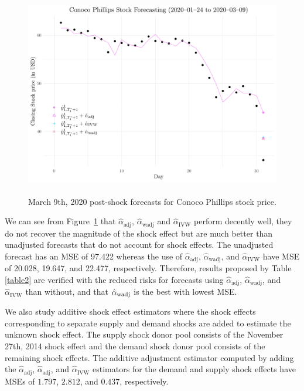 \documentclass[11pt]{article}
\theoremstyle{definition}
\begin{document}
\begin{figure}
  \begin{center}
    \includegraphics[height = 9cm]{fig2.pdf}
    \caption{March 9th, 2020 post-shock forecasts for Conoco Phillips stock price.}
    \label{Fig:CP}
  \end{center}  
  \vspace{-.6cm}
\end{figure}


We can see from Figure~\ref{Fig:CP} that $\hat{\alpha}_{\text{adj}}$, $\hat{\alpha}_{\text{wadj}}$ and $\hat{\alpha}_{\text{IVW}}$ perform decently well, they do not recover the magnitude of the shock effect but are much better than unadjusted forecasts that do not account for shock effects. 
The unadjusted forecast has an MSE of 97.422 whereas 
the use of $\hat{\alpha}_{\text{adj}}$, $\hat{\alpha}_{\text{wadj}}$, and $\hat{\alpha}_{\text{IVW}}$ have  MSE of 20.028,  19.647, and 22.477, respectively.
Therefore, results proposed by Table \ref{table2} are verified with the reduced risks for forecasts using  $\hat{\alpha}_{\text{adj}}$, $\hat{\alpha}_{\text{wadj}}$, and $\hat{\alpha}_{\text{IVW}}$ than without, and that $\hat{\alpha}_{\rm wadj}$ is the best with lowest MSE.





We also study additive shock effect estimators where the shock effects corresponding to separate supply and demand shocks are added to estimate the unknown shock effect. The supply shock donor pool consists of the November 27th, 2014 shock effect and the demand shock donor pool consists of the remaining shock effects. The additive adjustment estimator computed by adding the $\hat{\alpha}_{\text{adj}}$, $\hat{\alpha}_{\text{adj}}$, and $\hat{\alpha}_{\text{IVW}}$ estimators for the demand and supply shock effects have  MSEs of $1.797$, $2.812$, and $0.437$, respectively.  
\end{document}
